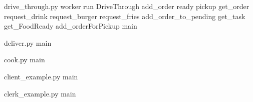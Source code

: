 drive\+\_\+through.\+py worker run Drive\+Through add\+\_\+order ready pickup get\+\_\+order request\+\_\+drink request\+\_\+burger request\+\_\+fries add\+\_\+order\+\_\+to\+\_\+pending get\+\_\+task get\+\_\+\+Food\+Ready add\+\_\+order\+For\+Pickup main

deliver.\+py main

cook.\+py main

client\+\_\+example.\+py main

clerk\+\_\+example.\+py main 